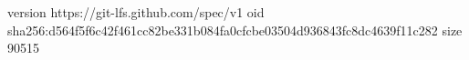 version https://git-lfs.github.com/spec/v1
oid sha256:d564f5f6c42f461cc82be331b084fa0cfcbe03504d936843fc8dc4639f11c282
size 90515
